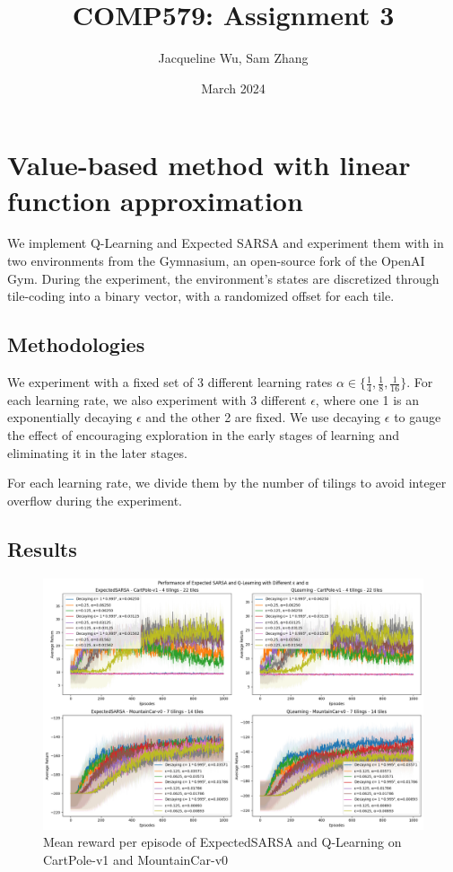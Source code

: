 \documentclass{article}
\title{COMP579: Assignment 3}
\author{Jacqueline Wu, Sam Zhang}
\date{March 2024}
\begin{document}
\maketitle

\section{Value-based method with linear function approximation}
We implement Q-Learning and Expected SARSA and experiment them with in two environments from the Gymnasium, an open-source fork of the OpenAI Gym.\cite{gymnasium}
During the experiment, the environment's states are discretized through tile-coding into a binary vector, with a randomized offset for each tile.

\subsection{Methodologies}
We experiment with a fixed set of 3 different learning rates $\alpha \in \{ \frac{1}{4}, \frac{1}{8}, \frac{1}{16} \}$.
For each learning rate, we also experiment with 3 different $\epsilon$, where one 1 is an
exponentially decaying $\epsilon$ and the other 2 are fixed. We use decaying $\epsilon$ to
gauge the effect of encouraging exploration in the early stages of learning
and eliminating it in the later stages.

For each learning rate, we divide them by the number of tilings to avoid integer overflow during
the experiment.

\subsection{Results}

\begin{figure}[htbp]
    \centering
    \includegraphics[scale=0.35]{q1.png}
    \caption{Mean reward per episode of ExpectedSARSA and Q-Learning on CartPole-v1 and MountainCar-v0}
    \label{fig:q1}
\end{figure}
\end{document}
